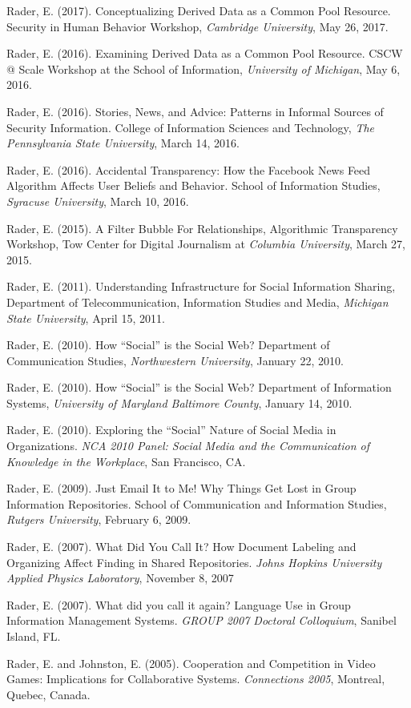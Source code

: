 \documentclass[9pt]{extarticle}
\begin{document}
Rader, E. (2017). Conceptualizing Derived Data as a Common Pool Resource. Security in Human Behavior Workshop, \emph{Cambridge University}, May 26, 2017.

Rader, E. (2016). Examining Derived Data as a Common Pool Resource. CSCW @ Scale Workshop at the School of Information, \emph{University of Michigan}, May 6, 2016.

Rader, E. (2016). Stories, News, and Advice: Patterns in Informal Sources of Security Information. College of Information Sciences and Technology, \emph{The Pennsylvania State University}, March 14, 2016.

Rader, E. (2016). Accidental Transparency: How the Facebook News Feed Algorithm Affects User Beliefs and Behavior. School of Information Studies, \emph{Syracuse University}, March 10, 2016.

Rader, E. (2015). A Filter Bubble For Relationships, Algorithmic Transparency Workshop, Tow Center for Digital Journalism at \emph{Columbia University}, March 27, 2015.

Rader, E. (2011). Understanding Infrastructure for Social Information Sharing, Department of Telecommunication, Information Studies and Media, \emph{Michigan State University}, April 15, 2011.

Rader, E. (2010). How ``Social'' is the Social Web? Department of Communication Studies, \emph{Northwestern University}, January 22, 2010.

Rader, E. (2010). How ``Social'' is the Social Web? Department of Information Systems, \emph{University of Maryland Baltimore County}, January 14, 2010.

Rader, E. (2010). Exploring the ``Social'' Nature of Social Media in Organizations. \emph{NCA 2010 Panel: Social Media and the Communication of Knowledge in the Workplace}, San Francisco, CA.

Rader, E. (2009). Just Email It to Me! Why Things Get Lost in Group Information Repositories. School of Communication and Information Studies, \emph{Rutgers University}, February 6, 2009.

Rader, E. (2007). What Did You Call It? How Document Labeling and Organizing Affect Finding in Shared Repositories. \emph{Johns Hopkins University Applied Physics Laboratory}, November 8, 2007

Rader, E. (2007). What did you call it again? Language Use in Group Information Management Systems. \emph{GROUP 2007 Doctoral Colloquium}, Sanibel Island, FL.

Rader, E. and Johnston, E. (2005). Cooperation and Competition in Video Games: Implications for Collaborative Systems. \emph{Connections 2005}, Montreal, Quebec, Canada.
\end{document}
